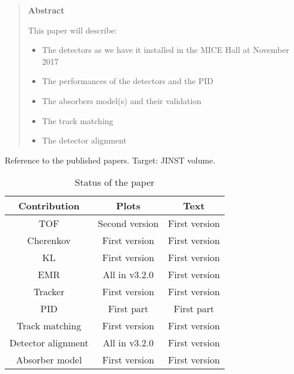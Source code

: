 \begin{quotation}
\begin{center}
\textbf{Abstract}
\end{center}
  \noindent
  This paper will describe:
  \begin{itemize}
    \item The detectors as we have it installed in the MICE Hall at November 2017
    \item The performances of the detectors and the PID
    \item The absorbers model(s) and their validation
    \item The track matching
    \item The detector alignment
  \end{itemize}
\end{quotation}

\noindent

Reference to the published papers.
Target: JINST volume.

\begin{table}[!ht]
  \caption{Status of the paper}
  \label{tab:}

  \begin{center}
    \begin{tabular}{c|c|c}
        \hline
       Contribution         & Plots             & Text\\
       \hline
       TOF                  & Second version    & First version \\
       Cherenkov            & First version     & First version \\
       KL                   & First version     & First version \\
       EMR                  & All in v3.2.0     & First version \\
       Tracker              & First version     & First version \\
       PID                  & First part        & First part \\
       Track matching       & First version     & First version \\
       Detector alignment   & All in v3.2.0     & First version \\
       Absorber model       & First version     & First version \\
       
       \hline
    \end{tabular}
  \end{center}
\end{table}
